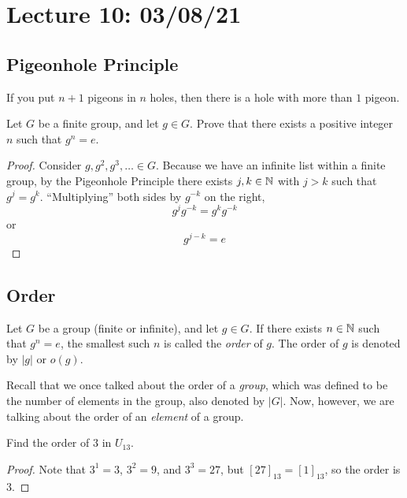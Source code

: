 \section{Lecture 10: 03/08/21}

\subsection{Pigeonhole Principle}

\begin{definition}
If you put $n+1$ pigeons in $n$ holes, then there is a hole with more than $1$ pigeon.
\end{definition}

\begin{example}
Let $G$ be a finite group, and let $g\in G$. Prove that there exists a positive integer $n$ such that $g^n=e$.
\end{example}

\begin{proof}
Consider $g,g^2,g^3,\dots\in G$. Because we have an infinite list within a finite group, by the Pigeonhole Principle there exists $j, k \in \mathbb{N}$ with $j > k$ such that $g^j = g^k$. ``Multiplying'' both sides by $g^{-k}$ on the right, 
\[g^jg^{-k}=g^kg^{-k}\]
or \[g^{j-k}=e\]
\end{proof}

\subsection{Order}

\begin{definition}[Order]
Let $G$ be a group (finite or infinite), and let $g\in G$. If there exists $n\in \mathbb{N}$ such that $g^n=e$, the smallest such $n$ is called the \textit{order} of $g$. The order of $g$ is denoted by $|g|$ or $o(g)$.
\end{definition}

Recall that we once talked about the order of a \textit{group}, which was defined to be the number of elements in the group, also denoted by $|G|$. Now, however, we are talking about the order of an \textit{element} of a group.

\begin{example}
Find the order of $3$ in $U_{13}$.
\end{example}

\begin{proof}
Note that $3^1 = 3$, $3^2 = 9$, and $3^3 = 27$, but $[27]_{13} = [1]_{13}$, so the order is $3$.
\end{proof}

